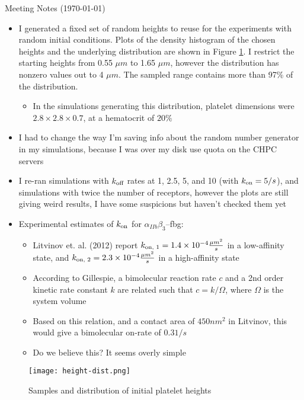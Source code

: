 \documentclass{article}
\newcommand{\tn}{\textnormal}
\begin{document}
\pagestyle{plain}

\begin{center}
  {\Large Meeting Notes (\today)}
\end{center}

\begin{itemize}
\item I generated a fixed set of random heights to reuse for the
  experiments with random initial conditions. Plots of the density
  histogram of the chosen heights and the underlying distribution are
  shown in Figure \ref{fig:plt-heights}. I restrict the starting
  heights from 0.55 $\mu m$ to 1.65 $\mu m$, however the distribution
  has nonzero values out to 4 $\mu m$. The sampled range contains more
  than 97\% of the distribution.
  \begin{itemize}
  \item In the simulations generating this distribution, platelet
    dimensions were $2.8 \times 2.8 \times 0.7$, at a hematocrit of
    $20 \%$
  \end{itemize}
\item I had to change the way I'm saving info about the random number
  generator in my simulations, because I was over my disk use quota on
  the CHPC servers
\item I re-ran simulations with $k_\tn{off}$ rates at 1, 2.5, 5, and
  10 (with $k_\tn{on} = 5 / s$), and simulations with twice the number
  of receptors, however the plots are still giving weird results, I
  have some suspicions but haven't checked them yet
\item Experimental estimates of $k_\tn{on}$ for $\alpha_{IIb}
  \beta_{3}$--fbg:
  \begin{itemize}
  \item Litvinov et. al. (2012) report
    $k_\tn{on, 1} = 1.4 \times 10^{-4} \frac{\mu m^2}{s}$ in a
    low-affinity state, and
    $k_\tn{on, 2} = 2.3 \times 10^{-4} \frac{\mu m^2}{s}$ in a
    high-affinity state
  \item According to Gillespie, a bimolecular reaction rate $c$
    and a 2nd order kinetic rate constant $k$ are related such that $c
    = k / \Omega$, where $\Omega$ is the system volume
  \item Based on this relation, and a contact area of $450 nm^2$ in
    Litvinov, this would give a bimolecular on-rate of $0.31 / s$
  \item Do we believe this? It seems overly simple
  \end{itemize}
\end{itemize}

\begin{figure}
  \centering
  \texttt{[image: height-dist.png]}
  \caption{Samples and distribution of initial platelet heights}
  \label{fig:plt-heights}
\end{figure}

% 
% 
\end{document}
